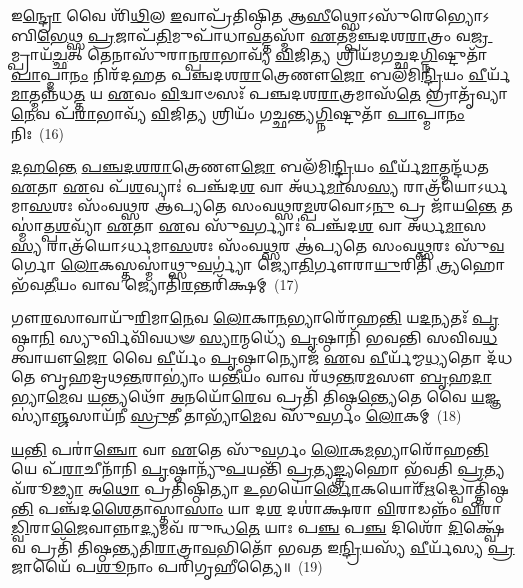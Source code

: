𑌇\-\ul{𑌨𑍍𑌦𑍍𑌰𑍋} 𑌵𑍈 𑌶𑌿᳴\-\ul{𑌥𑌿}\-𑌲 \ul{𑌇}\-𑌵𑌾𑌪𑍍𑌰᳴𑌤𑌿𑌷𑍍𑌠𑌿𑌤 𑌆\-\ul{𑌸𑍀}\-𑌥𑍍𑌸𑍋\-𑌽𑌸𑍁᳴𑌰𑍇𑌭𑍍𑌯𑍋\-𑌽𑌬𑌿\-\ul{𑌭𑍇}\-𑌥𑍍𑌸 \ul{𑌪𑍍𑌰}\-𑌜𑌾𑌪᳴\-\ul{𑌤𑌿}\-𑌮𑍁𑌪𑌾᳴𑌧𑌾\-\ul{𑌵}\-𑌤𑍍𑌤𑌸𑍍𑌮𑌾᳴ \ul{𑌏}\-𑌤𑌮𑍍𑌪᳴𑌞𑍍𑌚𑌦𑌶\-\ul{𑌰𑌾}\-𑌤𑍍𑌰𑌂 𑌵\-\ul{𑌜𑍍𑌰}\-𑌮𑍍𑌪𑍍𑌰𑌾𑌯᳴\-\ul{𑌚𑍍𑌛}\-𑌤𑍍 𑌤𑍇𑌨𑌾𑌸𑍁᳴𑌰𑌾𑌨𑍍𑌪\-\ul{𑌰𑌾}\-𑌭𑌾𑌵𑍍𑌯᳴ \ul{𑌵𑌿}\-𑌜𑌿\-\ul{𑌤𑍍𑌯} 𑌶𑍍𑌰𑌿𑌯᳴𑌮𑌗𑌚𑍍𑌛𑌦\-\ul{𑌗𑍍𑌨𑌿}\-𑌷𑍍𑌟𑍁𑌤𑌾᳴ \ul{𑌪𑌾}\-𑌪𑍍𑌮𑌾\-\ul{𑌨𑌂} 𑌨𑌿𑌰᳴𑌦𑌹𑌤 𑌪𑌞𑍍𑌚𑌦𑌶\-\ul{𑌰𑌾}\-𑌤𑍍𑌰𑍇𑌣𑍗\-\ul{𑌜𑍋} 𑌬𑌲᳴𑌮𑌿\-\ul{𑌨𑍍𑌦𑍍𑌰𑌿}\-𑌯𑌂 \ul{𑌵𑍀}\-𑌰𑍍𑌯᳴\-\ul{𑌮𑌾}\-𑌤𑍍𑌮𑌨𑍍𑌨᳴𑌧\-\ul{𑌤𑍍𑌤} 𑌯 \ul{𑌏}\-𑌵𑌂 \ul{𑌵𑌿}\-𑌦𑍍𑌵𑌾𑍞𑌸𑌃᳴ 𑌪𑌞𑍍𑌚𑌦𑌶\-\ul{𑌰𑌾}\-𑌤𑍍𑌰𑌮𑌾𑌸᳴\-\ul{𑌤𑍇} 𑌭𑍍𑌰𑌾𑌤𑍃᳴𑌵𑍍𑌯𑌾\-\ul{𑌨𑍇}\-𑌵 𑌪᳴\-\ul{𑌰𑌾}\-𑌭𑌾𑌵𑍍𑌯᳴ \ul{𑌵𑌿}\-𑌜𑌿\-\ul{𑌤𑍍𑌯} 𑌶𑍍𑌰𑌿𑌯𑌂᳴ 𑌗𑌚𑍍𑌛𑌨𑍍𑌤𑍍𑌯\-\ul{𑌗𑍍𑌨𑌿}\-𑌷𑍍𑌟𑍁𑌤𑌾᳴ \ul{𑌪𑌾}\-𑌪𑍍𑌮𑌾\-\ul{𑌨𑌂} 𑌨𑌿𑌃~(16)

\-\ul{𑌦}\-\-\ul{𑌹}\-\-\ul{𑌨𑍍𑌤𑍇} \ul{𑌪}\-\-\ul{𑌞𑍍𑌚}\-\-\ul{𑌦}\-\-\ul{𑌶}\-\-\ul{𑌰𑌾}\-𑌤𑍍𑌰𑍇𑌣𑍗\-\ul{𑌜𑍋} 𑌬𑌲᳴𑌮𑌿\-\ul{𑌨𑍍𑌦𑍍𑌰𑌿}\-𑌯𑌂 \ul{𑌵𑍀}\-𑌰𑍍𑌯᳴\-\ul{𑌮𑌾}\-𑌤𑍍𑌮𑌨𑍍𑌦᳴𑌧𑌤 \ul{𑌏}\-𑌤𑌾 \ul{𑌏}\-𑌵 𑌪᳴\-\ul{𑌶}\-𑌵𑍍𑌯𑌾𑌃॑ 𑌪𑌞𑍍𑌚᳴𑌦\-\ul{𑌶} 𑌵𑌾 𑌅᳴𑌰𑍍𑌧\-\ul{𑌮𑌾}\-𑌸\-\ul{𑌸𑍍𑌯} 𑌰𑌾𑌤𑍍𑌰᳴𑌯𑍋\-𑌽\-𑌰𑍍𑌧𑌮𑌾\-\ul{𑌸}\-𑌶𑌃 𑌸𑌂᳴𑌵\-\ul{𑌥𑍍𑌸}\-𑌰 𑌆॑𑌪𑍍𑌯𑌤𑍇 𑌸𑌂𑌵\-\ul{𑌥𑍍𑌸}\-𑌰\-\ul{𑌮𑍍𑌪}\-𑌶𑌵𑍋\-𑌽\-\ul{𑌨𑍁} 𑌪𑍍𑌰 𑌜𑌾᳴𑌯\-\ul{𑌨𑍍𑌤𑍇} 𑌤𑌸𑍍𑌮𑌾॑𑌤𑍍𑌪\-\ul{𑌶}\-𑌵𑍍𑌯𑌾᳴ \ul{𑌏}\-𑌤𑌾 \ul{𑌏}\-𑌵 𑌸𑍁᳴\-\ul{𑌵}\-𑌰𑍍𑌗𑍍𑌯𑌾𑌃॑ 𑌪𑌞𑍍𑌚᳴𑌦\-\ul{𑌶} 𑌵𑌾 𑌅᳴𑌰𑍍𑌧\-\ul{𑌮𑌾}\-𑌸\-\ul{𑌸𑍍𑌯} 𑌰𑌾𑌤𑍍𑌰᳴𑌯𑍋\-𑌽𑌰𑍍𑌧𑌮𑌾\-\ul{𑌸}\-𑌶𑌃 𑌸𑌂᳴𑌵\-\ul{𑌥𑍍𑌸}\-𑌰 𑌆॑𑌪𑍍𑌯𑌤𑍇 𑌸𑌂𑌵\-\ul{𑌥𑍍𑌸}\-𑌰𑌃 𑌸𑍁᳴\-\ul{𑌵}\-𑌰𑍍𑌗𑍋 \ul{𑌲𑍋}\-𑌕𑌸𑍍𑌤𑌸𑍍𑌮𑌾॑𑌥𑍍𑌸𑍁\-\ul{𑌵}\-𑌰𑍍𑌗𑍍𑌯𑌾॑ 𑌜𑍍𑌯𑍋\-\ul{𑌤𑌿}\-𑌰𑍍𑌗𑍗𑌰𑌾\-\ul{𑌯𑍁}\-𑌰𑌿𑌤𑌿᳴ \ul{𑌤𑍍𑌰𑍍𑌯}\-𑌹𑍋 𑌭᳴𑌵\-\ul{𑌤𑍀}\-𑌯𑌂 𑌵𑌾𑌵 𑌜𑍍𑌯𑍋𑌤𑌿᳴\-\ul{𑌰}\-𑌨𑍍𑌤𑌰𑌿᳴𑌕𑍍𑌷𑌮𑍍~(17)

𑌗𑍗\-\ul{𑌰}\-𑌸𑌾𑌵𑌾𑌯𑍁᳴\-\ul{𑌰𑌿}\-𑌮𑌾\-\ul{𑌨𑍇}\-𑌵 \ul{𑌲𑍋}\-𑌕𑌾\-\ul{𑌨}\-𑌭𑍍𑌯𑌾𑌰𑍋᳴𑌹\-\ul{𑌨𑍍𑌤𑌿} 𑌯\-\ul{𑌦}\-𑌨𑍍𑌯𑌤𑌃᳴ \ul{𑌪𑍃}\-𑌷𑍍𑌠𑌾\-\ul{𑌨𑌿} 𑌸𑍍𑌯𑍁𑌰𑍍𑌵𑌿𑌵𑌿᳴𑌵𑌧𑍟 \ul{𑌸𑍍𑌯𑌾}\-𑌨𑍍𑌮𑌧𑍍𑌯𑍇᳴ \ul{𑌪𑍃}\-𑌷𑍍𑌠𑌾𑌨𑌿᳴ 𑌭𑌵𑌨𑍍𑌤𑌿 𑌸𑌵𑌿𑌵\-\ul{𑌧}\-𑌤𑍍𑌵𑌾𑌯𑍗\-\ul{𑌜𑍋} 𑌵𑍈 \ul{𑌵𑍀}\-𑌰𑍍𑌯𑌂᳴ \ul{𑌪𑍃}\-𑌷𑍍𑌠𑌾𑌨𑍍𑌯𑍋𑌜᳴ \ul{𑌏}\-𑌵 \ul{𑌵𑍀}\-𑌰𑍍𑌯᳴𑌮𑍍𑌮\-\ul{𑌧𑍍𑌯}\-𑌤𑍋 𑌦᳴𑌧𑌤𑍇 𑌬𑍃𑌹𑌦𑍍𑌰𑌥\-\ul{𑌨𑍍𑌤}\-𑌰𑌾\-𑌭𑍍𑌯𑌾𑌂॑ 𑌯\-\ul{𑌨𑍍𑌤𑍀}\-𑌯𑌂 𑌵𑌾𑌵 𑌰᳴𑌥\-\ul{𑌨𑍍𑌤}\-𑌰\-\ul{𑌮}\-𑌸𑍗 \ul{𑌬𑍃}\-𑌹\-\ul{𑌦𑌾}\-𑌭𑍍𑌯𑌾\-\ul{𑌮𑍇}\-𑌵 \ul{𑌯}\-𑌨𑍍𑌤𑍍𑌯𑌥𑍋᳴ \ul{𑌅}\-𑌨𑌯𑍋᳴\-\ul{𑌰𑍇}\-𑌵 𑌪𑍍𑌰𑌤𑌿᳴ 𑌤𑌿𑌷𑍍𑌠\-\ul{𑌨𑍍𑌤𑍍𑌯𑍇}\-𑌤𑍇 𑌵𑍈 \ul{𑌯}\-𑌜𑍍𑌞𑌸𑍍𑌯𑌾॑\-\ul{𑌞𑍍𑌜}\-𑌸𑌾𑌯᳴𑌨𑍀 \ul{𑌸𑍍𑌰𑍁}\-𑌤𑍀 𑌤𑌾𑌭𑍍𑌯𑌾᳴\-\ul{𑌮𑍇}\-𑌵 𑌸𑍁᳴\-\ul{𑌵}\-𑌰𑍍𑌗𑌂 \ul{𑌲𑍋}\-𑌕𑌮𑍍~(18)

\-\ul{𑌯}\-\-\ul{𑌨𑍍𑌤𑌿} 𑌪𑌰𑌾॑\-\ul{𑌞𑍍𑌚𑍋} 𑌵𑌾 \ul{𑌏}\-𑌤𑍇 𑌸𑍁᳴\-\ul{𑌵}\-𑌰𑍍𑌗𑌂 \ul{𑌲𑍋}\-𑌕\-\ul{𑌮}\-𑌭𑍍𑌯𑌾𑌰𑍋᳴𑌹\-\ul{𑌨𑍍𑌤𑌿} 𑌯𑍇 𑌪᳴\-\ul{𑌰𑌾}\-𑌚𑍀𑌨𑌾᳴𑌨𑌿 \ul{𑌪𑍃}\-𑌷𑍍𑌠𑌾𑌨𑍍𑌯𑍁᳴\-\ul{𑌪}\-𑌯𑌨𑍍𑌤𑌿᳴ \ul{𑌪𑍍𑌰}\-𑌤𑍍𑌯\-\ul{𑌙𑍍𑌤𑍍𑌰𑍍𑌯}\-𑌹𑍋 𑌭᳴𑌵𑌤𑌿 \ul{𑌪𑍍𑌰}\-𑌤𑍍𑌯𑌵᳴𑌰𑍂\-\ul{𑌢𑍍𑌯𑌾} 𑌅\-\ul{𑌥𑍋} 𑌪𑍍𑌰𑌤𑌿᳴𑌷𑍍𑌠𑌿𑌤𑍍𑌯𑌾 \ul{𑌉}\-𑌭𑌯𑍋॑\-\ul{𑌰𑍍𑌲𑍋}\-𑌕𑌯𑍋𑌰𑍍᳴\-\ul{𑌋}\-𑌦𑍍𑌧𑍍𑌵𑍋𑌤𑍍𑌤𑌿᳴𑌷𑍍𑌠\-\ul{𑌨𑍍𑌤𑌿} 𑌪𑌞𑍍𑌚᳴𑌦\-\ul{𑌶𑍈}\-𑌤𑌾𑌸𑍍𑌤𑌾\-\ul{𑌸𑌾𑌂} 𑌯𑌾 𑌦\-\ul{𑌶} 𑌦𑌶𑌾॑𑌕𑍍𑌷𑌰𑌾 \ul{𑌵𑌿}\-𑌰𑌾𑌡𑌨𑍍𑌨𑌂᳴ \ul{𑌵𑌿}\-𑌰𑌾\-\ul{𑌡𑍍𑌵𑌿}\-𑌰𑌾\-\ul{𑌜𑍈}\-𑌵𑌾𑌨𑍍𑌨𑌾\-\ul{𑌦𑍍𑌯}\-\-𑌮𑌵᳴ 𑌰𑍁𑌨𑍍𑌧\-\ul{𑌤𑍇} 𑌯𑌾𑌃 𑌪\-\ul{𑌞𑍍𑌚} 𑌪\-\ul{𑌞𑍍𑌚} 𑌦𑌿𑌶𑍋᳴ \ul{𑌦𑌿}\-𑌕𑍍𑌷𑍍𑌵𑍇᳴𑌵 𑌪𑍍𑌰𑌤𑌿᳴ 𑌤𑌿𑌷𑍍𑌠𑌨𑍍𑌤𑍍𑌯𑌤𑌿\-\ul{𑌰𑌾}\-𑌤𑍍𑌰𑌾\-\ul{𑌵}\-𑌭𑌿𑌤𑍋᳴ 𑌭𑌵𑌤 𑌇\-\ul{𑌨𑍍𑌦𑍍𑌰𑌿}\-𑌯𑌸𑍍𑌯᳴ \ul{𑌵𑍀}\-𑌰𑍍𑌯᳴𑌸𑍍𑌯 \ul{𑌪𑍍𑌰}\-𑌜𑌾𑌯𑍈᳴ 𑌪\-\ul{𑌶𑍂}\-𑌨𑌾𑌂 𑌪𑌰𑌿᳴𑌗𑍃𑌹𑍀𑌤𑍍𑌯𑍈॥~(19)

